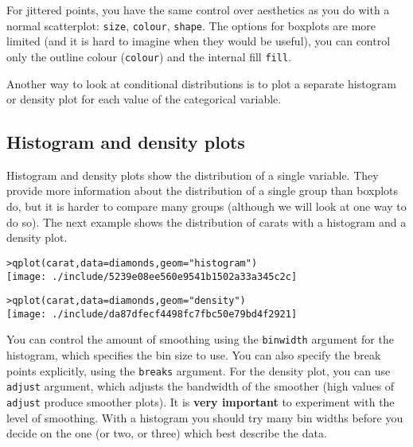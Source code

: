 % 
For jittered points, you have the same control over aesthetics as you do with a normal scatterplot: {\tt size}, {\tt colour}, {\tt shape}.  The options for boxplots are more limited (and it is hard to imagine when they would be useful), you can control only the outline colour ({\tt colour}) and the internal fill {\tt fill}.

Another way to look at conditional distributions is to plot a separate histogram or density plot for each value of the categorical variable.

\subsection{Histogram and density plots}\label{sub:density}

Histogram and density plots show the distribution of a single variable.  They provide more information about the distribution of a single group than boxplots do, but it is harder to compare many groups (although we will look at one way to do so).  The next example shows the distribution of carats with a histogram and a density plot.

\begin{alltt}
> qplot(carat, data = diamonds, geom = "histogram")
\texttt{[image: ./include/5239e08ee560e9541b1502a33a345c2c]}

> qplot(carat, data = diamonds, geom = "density")
\texttt{[image: ./include/da87dfecf4498fc7fbc50e79bd4f2921]}

\end{alltt}

You can control the amount of smoothing using the {\tt binwidth} argument for the histogram, which specifies the bin size to use.  You can also specify the break points explicitly, using the {\tt breaks} argument.  For the density plot, you can use {\tt adjust} argument, which adjusts the bandwidth of the smoother (high values of {\tt adjust} produce smoother plots).  It is {\bf very important} to experiment with the level of smoothing.  With a histogram you should try many bin widths before you decide on the one (or two, or three) which best describe the data.

